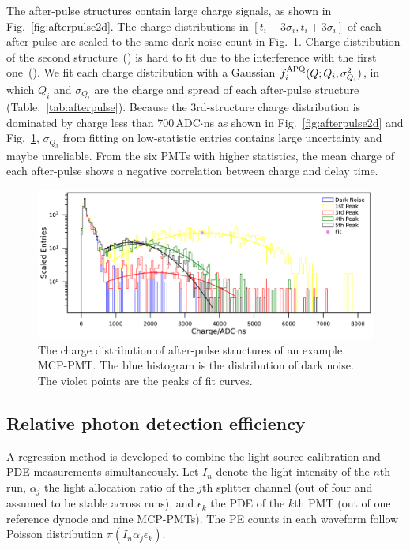 The after-pulse structures contain large charge signals, as shown in Fig.~\ref{fig:afterpulse2d}. The charge distributions in $[t_i-3\sigma_i,t_i+3\sigma_i]$ of each after-pulse are scaled to the same dark noise count in Fig.~\ref{fig:afterpulsecharge}.  Charge distribution of the second structure~() is hard to fit due to the interference with the first one~().  We fit each charge distribution with a Gaussian $f^{\rm APQ}_i(Q;Q_i,\sigma_{Q_i}^2)$, in which $Q_i$ and $\sigma_{Q_i}$ are the charge and spread of each after-pulse structure (Table.~\ref{tab:afterpulse}). Because the 3rd-structure charge distribution is dominated by charge less than 700\,ADC$\cdot$ns as shown in Fig.~\ref{fig:afterpulse2d} and Fig.~\ref{fig:afterpulsecharge}, $\sigma_{Q_3}$ from fitting on low-statistic entries contains large uncertainty and maybe unreliable. From the six PMTs with higher statistics, the mean charge of each after-pulse shows a negative correlation between charge and delay time.

\begin{figure}[!htbp]
    \centering
    \includegraphics[width=\textwidth]{figures/method/triggerafterpulseCharge.pdf}
    \caption{The charge distribution of after-pulse structures of an example MCP-PMT. The blue histogram is the distribution of dark noise. The violet points are the peaks of fit curves.}
    \label{fig:afterpulsecharge}
\end{figure}

\subsection{Relative photon detection efficiency}
\label{sec:PDE}
A regression method is developed to combine the light-source calibration and PDE measurements simultaneously. Let $I_n$ denote the light intensity of the $n$th run, $\alpha_j$ the light allocation ratio of the $j$th splitter channel (out of four and assumed to be stable across runs), and $\epsilon_k$ the PDE of the $k$th PMT (out of one reference dynode and nine MCP-PMTs). The PE counts in each waveform follow Poisson distribution $\pi(I_n\alpha_j\epsilon_k)$.

